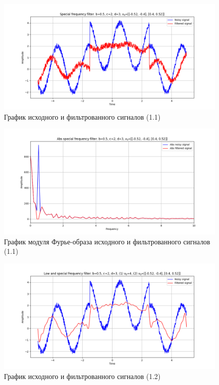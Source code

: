 \documentclass[a4paper, 12pt]{article}
\begin{document}
    \begin{figure}[H]
        \centering
        \includegraphics[scale=0.48]{1_nospec.png}
        \captionsetup{skip=0pt}
        \caption{График исходного и фильтрованного сигналов (1.1)}
        \label{fig:fig71}
    \end{figure}
    \begin{figure}[H]
        \centering
        \includegraphics[scale=0.48]{1_abs_nospec.png}
        \captionsetup{skip=0pt}
        \caption{График модуля Фурье-образа исходного и фильтрованного сигналов (1.1)}
        \label{fig:fig72}
    \end{figure}
    \begin{figure}[H]
        \centering
        \includegraphics[scale=0.48]{1_nospec_nohigh.png}
        \captionsetup{skip=0pt}
        \caption{График исходного и фильтрованного сигналов (1.2)}
        \label{fig:fig77}
    \end{figure}
\end{document}
